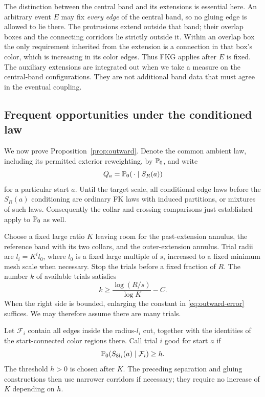 The distinction between the central band and its extensions is
essential here.  An arbitrary event $E$ may fix \emph{every edge}
of the central band, so no gluing edge is allowed to lie there.
The protrusions extend outside that band; their overlap boxes and
the connecting corridors lie strictly outside it.  Within an
overlap box the only requirement inherited from the extension is
a connection in that box's color, which is increasing in its
color edges.  Thus FKG applies after $E$ is fixed.  The auxiliary
extensions are integrated out when we take a measure on the
central-band configurations.  They are not additional band data
that must agree in the eventual coupling.

\subsection{Frequent opportunities under the conditioned law}

We now prove Proposition~\ref{prop:outward}.  Denote the common
ambient law, including its permitted exterior reweighting, by
$\mathbb P_0$, and write
\[
 Q_a=\mathbb P_0(\,\cdot\mid S_R(a))
\]
for a particular start $a$.  Until the target scale, all conditional
edge laws before the $S_R(a)$ conditioning are ordinary FK laws
with induced partitions, or mixtures of such laws.  Consequently
the collar and crossing comparisons just established apply to
$\mathbb P_0$ as well.

Choose a fixed large ratio $K$ leaving room for the past-extension
annulus, the reference band with its two collars, and the
outer-extension annulus.  Trial radii are
$l_i=K^i l_0$, where $l_0$ is a fixed large multiple of $s$,
increased to a fixed minimum mesh scale when necessary.  Stop the
trials before a fixed fraction of $R$.  The number $k$ of available
trials satisfies
\[
 k\ge \frac{\log(R/s)}{\log K}-C.
\]
When the right side is bounded, enlarging the constant in
\eqref{eq:outward-error} suffices.  We may therefore assume there
are many trials.

Let $\mathcal F_i$ contain all edges inside the radius-$l_i$ cut,
together with the identities of the start-connected color
regions there.  Call trial $i$ good for start $a$ if
\begin{equation}\label{eq:good-trial}
 \mathbb P_0(S_{8l_i}(a)\mid\mathcal F_i)\ge h.
\end{equation}
The threshold $h>0$ is chosen after $K$.  The preceding separation
and gluing constructions then use narrower corridors if necessary;
they require no increase of $K$ depending on $h$.

